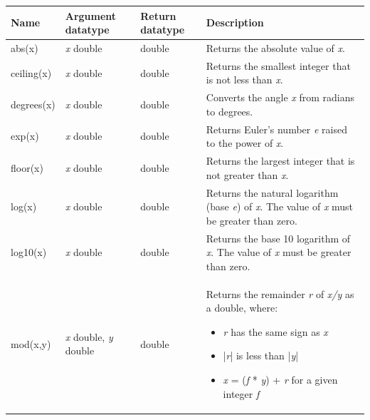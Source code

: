 \documentclass[11pt,a4paper]{ivoa}
\begin{document}
\begin{table}[tpb]\footnotesize
    \begin{tabular}{|p{}|p{}|p{}|p{}|}

        \hline
        \textbf{Name} &
        \textbf{Argument \newline datatype} &
        \textbf{Return \newline datatype} &
        \textbf{Description}
        \tabularnewline

        \hline
        abs(x) &
        \textit{x} double &
        double &
        Returns the absolute value of \textit{x}.
        \tabularnewline

        \hline
        ceiling(x) &
        \textit{x} double &
        double &
        Returns the smallest integer that is not less than \textit{x}.
        \tabularnewline

        \hline
        degrees(x) &
        \textit{x} double &
        double &
        Converts the angle \textit{x} from radians to degrees.
        \tabularnewline

        \hline
        exp(x) &
        \textit{x} double &
        double &
        Returns Euler’s number \textit{e} raised to the power of \textit{x}.
        \tabularnewline

        \hline
        floor(x) &
        \textit{x} double &
        double &
        Returns the largest integer that is not greater than \textit{x}.
        \tabularnewline

        \hline
        log(x) &
        \textit{x} double &
        double &
        Returns the natural logarithm (base \textit{e}) of \textit{x}. The value of \textit{x} must be greater than zero.
        \tabularnewline

        \hline
        log10(x) &
        \textit{x} double &
        double &
        Returns the base 10 logarithm of \textit{x}. The value of \textit{x} must be greater than zero.
        \tabularnewline

        \hline
        mod(x,y) &
        \textit{x} double,
        \newline
        \textit{y} double &
        double &
        Returns the remainder \textit{r} of \textit{x/y} as a double,
        where:
        \begin{itemize}
            \item \textit{r} has the same sign as \textit{x}
            \item |\textit{r}| is less than |\textit{y}|
            \item \textit{x} = (\textit{f} * \textit{y}) + \textit{r} for a given integer \textit{f}
        \end{itemize}
        \tabularnewline


\end{tabular}
\end{table}
\end{document}
